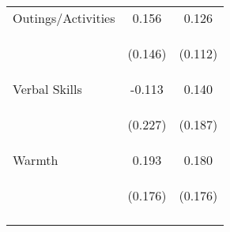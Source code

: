 \begin{tabular}{lcc}
\noalign{\smallskip}Outings/Activities & 0.156 & 0.126\\
 & \begin{footnotesize}(0.146)\end{footnotesize} & \begin{footnotesize}(0.112)\end{footnotesize}\\
\noalign{\smallskip}Verbal Skills & -0.113 & 0.140\\
 & \begin{footnotesize}(0.227)\end{footnotesize} & \begin{footnotesize}(0.187)\end{footnotesize}\\
\noalign{\smallskip}Warmth & 0.193 & 0.180\\
 & \begin{footnotesize}(0.176)\end{footnotesize} & \begin{footnotesize}(0.176)\end{footnotesize}\\
\noalign{\smallskip}\hline\end{tabular}\\
